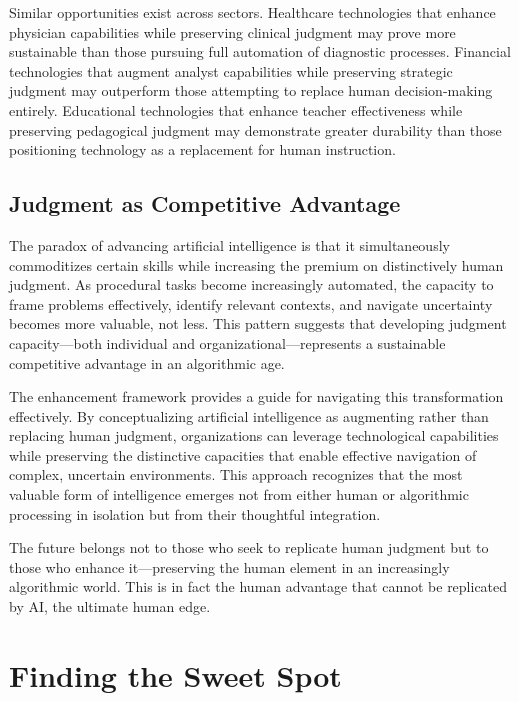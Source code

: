 \documentclass[
  Letterpaper,
]{scrbook}
\begin{document}
Similar opportunities exist across sectors. Healthcare technologies that
enhance physician capabilities while preserving clinical judgment may
prove more sustainable than those pursuing full automation of diagnostic
processes. Financial technologies that augment analyst capabilities
while preserving strategic judgment may outperform those attempting to
replace human decision-making entirely. Educational technologies that
enhance teacher effectiveness while preserving pedagogical judgment may
demonstrate greater durability than those positioning technology as a
replacement for human instruction.

\section{Judgment as Competitive
Advantage}\label{judgment-as-competitive-advantage}

The paradox of advancing artificial intelligence is that it
simultaneously commoditizes certain skills while increasing the premium
on distinctively human judgment. As procedural tasks become increasingly
automated, the capacity to frame problems effectively, identify relevant
contexts, and navigate uncertainty becomes more valuable, not less. This
pattern suggests that developing judgment capacity---both individual and
organizational---represents a sustainable competitive advantage in an
algorithmic age.

The enhancement framework provides a guide for navigating this
transformation effectively. By conceptualizing artificial intelligence
as augmenting rather than replacing human judgment, organizations can
leverage technological capabilities while preserving the distinctive
capacities that enable effective navigation of complex, uncertain
environments. This approach recognizes that the most valuable form of
intelligence emerges not from either human or algorithmic processing in
isolation but from their thoughtful integration.

The future belongs not to those who seek to replicate human judgment but
to those who enhance it---preserving the human element in an
increasingly algorithmic world. This is in fact the human advantage that
cannot be replicated by AI, the ultimate human edge.


\chapter{Finding the Sweet Spot}\label{finding-the-sweet-spot}
\end{document}
